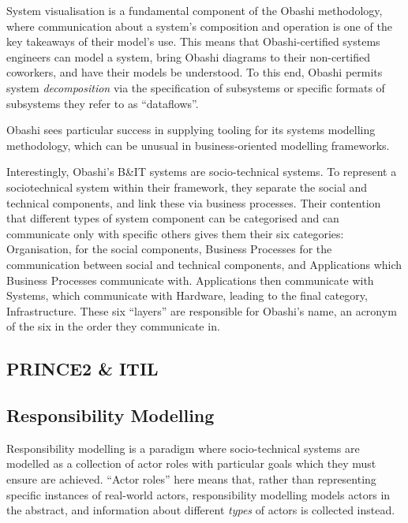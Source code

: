 System visualisation is a fundamental component of the Obashi methodology, where communication about a system's composition and operation is
one of the key takeaways of their model's use. This means that Obashi-certified
systems engineers can model a system, bring Obashi diagrams to their
non-certified coworkers, and have their models be understood. To this end,
Obashi permits system \emph{decomposition} via the specification of subsystems
or specific formats of subsystems they refer to as ``dataflows''.
\par

Obashi sees particular success in supplying tooling for its systems
modelling methodology, which can be unusual in business-oriented modelling
frameworks.
\par

Interestingly, Obashi's B\&IT systems are socio-technical systems. To represent
a sociotechnical system within their framework, they separate the social and
technical components, and link these via business processes. Their contention
that different types of system component can be categorised and can communicate
only with specific others gives them their six categories: Organisation, for the
social components, Business Processes for the communication between social and
technical components, and Applications which Business Processes communicate
with. Applications then communicate with Systems, which communicate with
Hardware, leading to the final category, Infrastructure. These six ``layers''
are responsible for Obashi's name, an acronym of the six in the order they
communicate in.
\par

\subsection{PRINCE2 \& ITIL}


\subsection{Responsibility Modelling}
Responsibility modelling is a paradigm where socio-technical systems are
modelled as a collection of actor roles with particular goals which they must
ensure are achieved. ``Actor roles'' here means that, rather than representing
specific instances of real-world actors, responsibility modelling models actors
in the abstract, and information about different \emph{types} of actors is
collected instead.
\par


